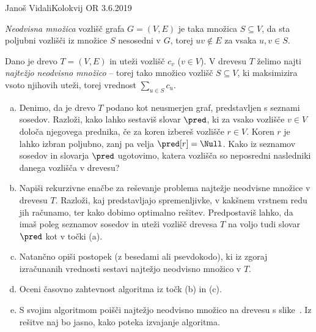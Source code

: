 \begin{naloga}{Janoš Vidali}{Kolokvij OR 3.6.2019}
\begin{vprasanje}
{\em Neodvisna množica} vozlišč grafa $G = (V, E)$
je taka množica $S \subseteq V$,
da sta poljubni vozlišči iz množice $S$ nesosedni v $G$,
torej $uv \not\in E$ za vsaka $u, v \in S$.

Dano je drevo $T = (V, E)$ in uteži vozlišč $c_v$ ($v \in V$).
V drevesu $T$ želimo najti {\em najtežjo neodvisno množico}
-- torej tako množico vozlišč $S \subseteq V$,
ki maksimizira vsoto njihovih uteži, torej vrednost $\sum_{u \in S} c_u$.

\begin{enumerate}[(a)]
\item Denimo, da je drevo $T$ podano kot neusmerjen graf,
predstavljen s seznami sosedov.
Razloži, kako lahko sestaviš slovar $\pred$,
ki za vsako vozlišče $v \in V$ določa njegovega prednika,
če za koren izbereš vozlišče $r \in V$.
Koren $r$ je lahko izbran poljubno, zanj pa velja $\pred[r] = \Null$.
Kako iz seznamov sosedov in slovarja $\pred$ ugotovimo,
katera vozlišča so neposredni nasledniki danega vozlišča v drevesu?

\item Napiši rekurzivne enačbe za reševanje problema
najtežje neodvisne množice v drevesu $T$.
Razloži, kaj pred\-stav\-lja\-jo spremenljivke,
v kakšnem vrstnem redu jih računamo, ter kako dobimo optimalno rešitev.
Predpostaviš lahko,
da imaš poleg seznamov sosedov in uteži vozlišč drevesa $T$
na voljo tudi slovar $\pred$ kot v točki (a).

\item Natančno opiši postopek (z besedami ali psevdokodo),
ki iz zgoraj izračunanih vred\-no\-sti
sestavi najtežjo neodvisno množico v $T$.

\item Oceni časovno zahtevnost algoritma iz točk (b) in (c).

\item S svojim algoritmom poišči najtežjo neodvisno množico
na drevesu s slike~\fig.
Iz re\-šit\-ve naj bo jasno, kako poteka izvajanje algoritma.
\end{enumerate}
%
\begin{slika}
\makebox[\textwidth][c]{
\pgfslika
}
\end{slika}
\end{vprasanje}


\end{naloga}
